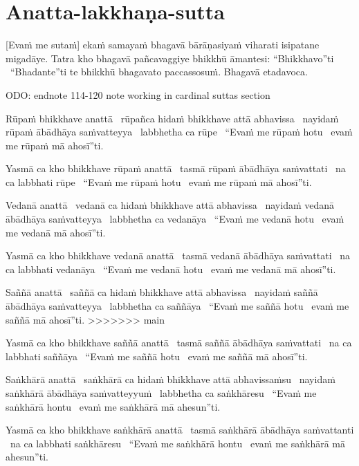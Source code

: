 \section{Anatta-lakkhaṇa-sutta}
\label{anatta-lakkhana}

[Evaṁ me sutaṁ] ekaṁ samayaṁ bhagavā bārāṇasiyaṁ viharati isipatane migadāye. Tatra kho bhagavā pañcavaggiye bhikkhū āmantesi: ``Bhikkhavo''ti \breathmark\ ``Bhadante''ti te bhikkhū bhagavato paccassosuṁ. Bhagavā etadavoca.

ODO: endnote 114-120 note working in cardinal suttas section

Rūpaṁ bhikkhave anattā \breathmark\ rūpañca hidaṁ bhikkhave attā abhavissa \breathmark\ nayidaṁ rūpaṁ ābādhāya saṁvatteyya \breathmark\ labbhetha ca rūpe \breathmark\ ``Evaṁ me rūpaṁ hotu \breathmark\ evaṁ me rūpaṁ mā ahosī''ti.

Yasmā ca kho bhikkhave rūpaṁ anattā \breathmark\ tasmā rūpaṁ ābādhāya saṁvattati \breathmark\ na ca labbhati rūpe \breathmark\ ``Evaṁ me rūpaṁ hotu \breathmark\ evaṁ me rūpaṁ mā ahosī''ti.

Vedanā anattā \breathmark\ vedanā ca hidaṁ bhikkhave attā abhavissa \breathmark\ nayidaṁ vedanā ābādhāya saṁvatteyya \breathmark\ labbhetha ca vedanāya \breathmark\ ``Evaṁ me vedanā hotu \breathmark\ evaṁ me vedanā mā ahosī''ti.

Yasmā ca kho bhikkhave vedanā anattā \breathmark\ tasmā vedanā ābādhāya saṁvattati \breathmark\ na ca labbhati vedanāya \breathmark\ ``Evaṁ me vedanā hotu \breathmark\ evaṁ me vedanā mā ahosī''ti.

Saññā anattā \breathmark\ saññā ca hidaṁ bhikkhave attā abhavissa \breathmark\ nayidaṁ saññā ābādhāya saṁvatteyya \breathmark\ labbhetha ca saññāya \breathmark\ ``Evaṁ me saññā hotu \breathmark\ evaṁ me saññā mā ahosī''ti.
>>>>>>> main

Yasmā ca kho bhikkhave saññā anattā \breathmark\ tasmā saññā ābādhāya saṁvattati \breathmark\ na ca labbhati saññāya \breathmark\ ``Evaṁ me saññā hotu \breathmark\ evaṁ me saññā mā ahosī''ti.

Saṅkhārā anattā \breathmark\ saṅkhārā ca hidaṁ bhikkhave attā abhavissaṁsu \breathmark\ nayidaṁ saṅkhārā ābādhāya saṁvatteyyuṁ \breathmark\ labbhetha ca saṅkhāresu \breathmark\ ``Evaṁ me saṅkhārā hontu \breathmark\ evaṁ me saṅkhārā mā ahesun''ti.

Yasmā ca kho bhikkhave saṅkhārā anattā \breathmark\ tasmā saṅkhārā ābādhāya saṁvattanti \breathmark\ na ca labbhati saṅkhāresu \breathmark\ ``Evaṁ me saṅkhārā hontu \breathmark\ evaṁ me saṅkhārā mā ahesun''ti.

